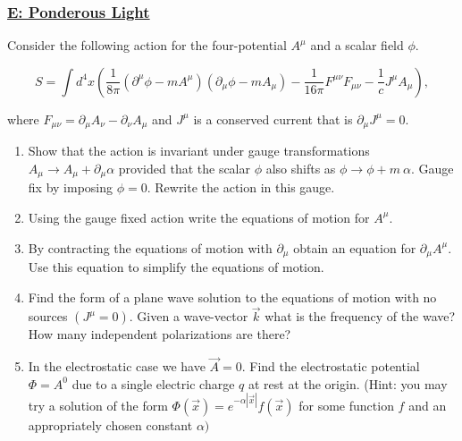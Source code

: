 \subsubsection{\hyperref[E: Ponderous Light]{E: Ponderous Light}}
Consider the following action for the four-potential $A^{\mu}$ and a scalar field $\phi$.

\begin{equation}
	S=\int d^{4} x\left(\frac{1}{8 \pi}\left(\partial^{\mu} \phi-m A^{\mu}\right)\left(\partial_{\mu} \phi-m A_{\mu}\right)-\frac{1}{16 \pi} F^{\mu \nu} F_{\mu \nu}-\frac{1}{c} J^{\mu} A_{\mu}\right),
\end{equation}

where $F_{\mu \nu}=\partial_{\mu} A_{\nu}-\partial_{\nu} A_{\mu}$ and $J^{\mu}$ is a conserved current that is $\partial_{\mu} J^{\mu}=0$.

\begin{enumerate}
	\item Show that the action is invariant under gauge transformations $A_{\mu} \rightarrow A_{\mu}+\partial_{\mu} \alpha$ provided that the scalar $\phi$ also shifts as $\phi \rightarrow \phi+m\: \alpha .$ Gauge fix by imposing $\phi=0 .$ Rewrite the action in this gauge.
	\item Using the gauge fixed action write the equations of motion for $A^{\mu}$.
	\item By contracting the equations of motion with $\partial_{\mu}$ obtain an equation for $\partial_{\mu} A^{\mu} .$ Use this equation to simplify the equations of motion.
	\item Find the form of a plane wave solution to the equations of motion with no sources $\left(J^{\mu}=0\right)$. Given a wave-vector $\vec{k}$ what is the frequency of the wave? How many independent polarizations are there?
	\item In the electrostatic case we have $\vec{A}=0 .$ Find the electrostatic potential
	$\Phi=A^{0}$ due to a single electric charge $q$ at rest at the origin.
	(Hint: you may try a solution of the form $\Phi(\vec{x})=e^{-\alpha|\vec{x}|} f(\vec{x})$ for some function $f$ and an appropriately chosen constant $\alpha)$
\end{enumerate}


